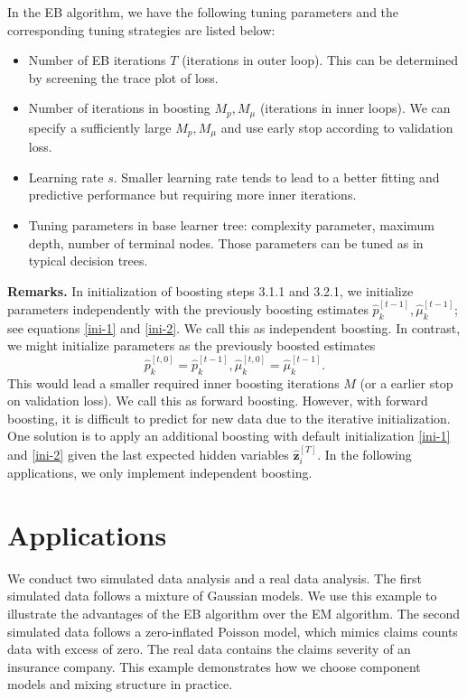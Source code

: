 \documentclass[11pt]{article}
\numberwithin{equation}{section}
\def\bz{\boldsymbol{z}}
\begin{document}
In the EB algorithm, we have the following tuning parameters and the corresponding tuning strategies are listed below:
	\begin{itemize}
		\item Number of EB iterations {$T$} (iterations in outer loop). This can be determined by screening the trace plot of loss.
		\item Number of iterations in boosting {$M_p,M_\mu$} (iterations in inner loops). We can specify a sufficiently large $M_p,M_\mu$ and use  early stop according to validation loss.
		\item Learning rate {$s$}. Smaller learning rate tends to lead to a better fitting and predictive performance but requiring more inner iterations.
		\item Tuning parameters in base learner tree: complexity parameter, maximum depth, number of terminal nodes. Those parameters can be tuned as in typical decision trees.
	\end{itemize}

		
{\bf Remarks.}
	In initialization of boosting steps 3.1.1 and 3.2.1, we initialize parameters {independently} with the previously boosting estimates $\hat{p}_k^{[t-1]}, \hat{\mu}_k^{[t-1]}$; see equations \eqref{ini-1} and \eqref{ini-2}. We call this as independent boosting.
	In contrast, we might initialize parameters as the previously boosted estimates $$\hat{p}_k^{[t,0]}=\hat{p}_k^{[t-1]}, \hat{\mu}_k^{[t,0]}=\hat{\mu}_k^{[t-1]}.$$
		This would lead a {smaller} required inner boosting iterations $M$ (or a {earlier} stop on validation loss). 
	We call this as forward boosting. 
	However, with forward boosting, it is difficult to predict for new data due to the {iterative initialization}. One solution is to apply an additional boosting with default initialization \eqref{ini-1} and \eqref{ini-2} given the {last expected hidden variables $\hat{\bz}_i^{[T]}$}. In the following applications, we only implement independent boosting.
			
\section{Applications}

We conduct two simulated data analysis and a real data analysis. 
The first simulated data follows a mixture of Gaussian models. 
We use this example to illustrate the advantages of the EB algorithm over the EM algorithm.
The second simulated data follows a zero-inflated Poisson model, which mimics claims counts data with excess of zero.
The real data contains the claims severity of an insurance company. This example demonstrates how we choose component models and mixing structure in practice.
\end{document}
